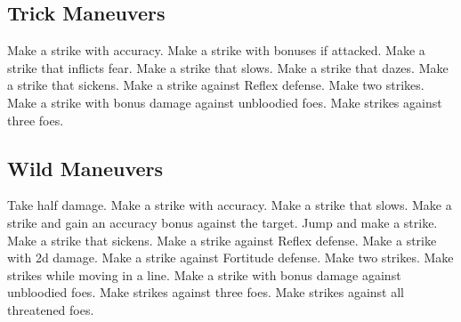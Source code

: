 \small
\subsection{Trick Maneuvers}\label{Trick Maneuvers}
\begin{spelllist}
 Make a strike with  accuracy.
 Make a strike with bonuses if attacked.
 Make a strike that inflicts fear.
 Make a strike that slows.
 Make a strike that dazes.
 Make a strike that sickens.
 Make a strike against Reflex defense.
 Make two strikes.
 Make a strike with bonus damage against unbloodied foes.
 Make strikes against three foes.
\end{spelllist}



\small
\subsection{Wild Maneuvers}\label{Wild Maneuvers}
\begin{spelllist}
 Take half damage.
 Make a strike with  accuracy.
 Make a strike that slows.
 Make a strike and gain an accuracy bonus against the target.
 Jump and make a strike.
 Make a strike that sickens.
 Make a strike against Reflex defense.
 Make a strike with \plus2d damage.
 Make a strike against Fortitude defense.
 Make two strikes.
 Make strikes while moving in a line.
 Make a strike with bonus damage against unbloodied foes.
 Make strikes against three foes.
 Make strikes against all threatened foes.
\end{spelllist}
